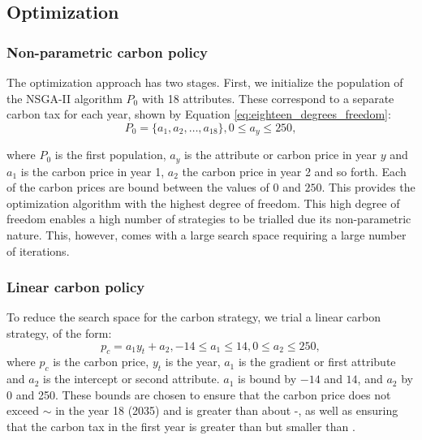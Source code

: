 \documentclass[sigconf]{acmart}
\begin{document}
\subsection{Optimization}
\label{ssec:optimization}
\subsubsection{Non-parametric carbon policy}
\label{sssec:non_parametric_strategy}
The optimization approach has two stages. First, we initialize the population of the NSGA-II algorithm $P_0$ with 18 attributes. These correspond to a separate carbon tax for each year, shown by Equation \ref{eq:eighteen_degrees_freedom}:
\begin{equation}
\label{eq:eighteen_degrees_freedom}
	P_0=\{a_1,a_2,\ldots,a_{18}\}, 0\leq a_y\leq 250,
\end{equation} 

\noindent where $P_0$ is the first population, $a_y$ is the attribute or carbon price in year $y$ and $a_1$ is the carbon price in year 1, $a_2$ the carbon price in year 2 and so forth. Each of the carbon prices are bound between the values of \textsterling$0$ and \textsterling$250$. This provides the optimization algorithm with the highest degree of freedom. This high degree of freedom enables a high number of strategies to be trialled due its non-parametric nature. This, however, comes with a large search space requiring a large number of iterations.


 \subsubsection{Linear carbon policy}
 \label{sssec:linear_carbon_strategy}
 To reduce the search space for the carbon strategy, we trial a linear carbon strategy, of the form:
 \begin{equation}
 	p_c=a_1y_t+a_2, -14 \leq a_1\leq 14, 0 \leq a_2\leq 250,
 \end{equation}
 \noindent where $p_c$ is the carbon price, $y_t$ is the year, $a_1$ is the gradient or first attribute and $a_2$ is the intercept or second attribute. $a_1$ is bound by $-14$ and $14$, and $a_2$ by 0 and 250. These bounds are chosen to ensure that the carbon price does not exceed ${\sim}$ in the year 18 (2035) and is greater than about -, as well as ensuring that the carbon tax in the first year is greater than  but smaller than .
\end{document}
